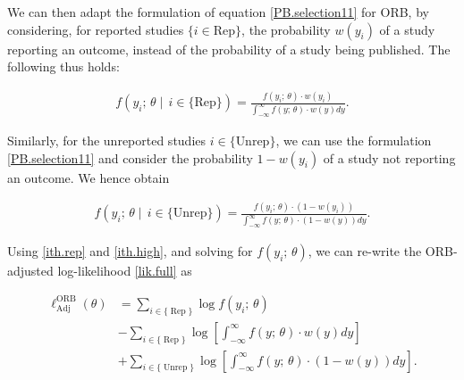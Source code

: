 \documentclass[twocolumn]{article}\usepackage[]{graphicx}\usepackage[]{xcolor}
\begin{document}
\bigskip

We can then adapt the formulation of equation \eqref{PB.selection11} for ORB, by considering, for reported studies $ \{i \in \text{Rep} \}$, the probability $w(y_i)$ of a study reporting an outcome, instead of the probability of a study being published. The following thus holds:

\bigskip

\begin{equation}
\label{ith.rep}
\begin{aligned}
f\left(y_i \text{; } \theta \mid  \, i \in \{\text{Rep}\} \right) = \frac{f\left(y_i \text{; } \theta \right) \cdot w(y_i)}{\int_{-\infty}^{\infty} f\left(y \text{; } \theta \right) \cdot w(y) d y} \text{.}
\end{aligned}
\end{equation}

\bigskip

Similarly, for the unreported studies $i \in \{\text{Unrep} \}$, we can use the formulation \eqref{PB.selection11} and consider the probability $1-w(y_i)$ of a study not reporting an outcome. We hence obtain

\bigskip

\begin{equation}
\label{ith.high}
\begin{aligned}
f\left(y_i \text{; } \theta \mid \, i \in \{\text{Unrep} \} \right) = \frac{f \left(y_i \text{; } \theta \right) \cdot \left(1-w(y_i) \right)}{\int_{-\infty}^{\infty} f \left(y \text{; } \theta \right) \cdot \left(1-w(y) \right) d y} \text{.}
\end{aligned}
\end{equation}

\bigskip

Using \eqref{ith.rep} and \eqref{ith.high}, and solving for $f(y_i \text{; } \theta)$, we can re-write the ORB-adjusted log-likelihood \eqref{lik.full} as

\bigskip


\begin{equation}
\label{lik.rewritten}
\begin{aligned}
\ell_{\text{Adj}}^{\text{ORB}} \left(\theta \right) & = \sum_{i \in \{\operatorname{Rep} \} } \log  f(y_i \text{; } \theta)\\
& - \sum_{i \in \{\operatorname{Rep} \} } \log \left[ \int_{-\infty}^{\infty} f\left(y \text{; } \theta \right) \cdot w(y) dy \right]\\
& + \sum_{i \in \{ \operatorname{Unrep} \}} \log \left[ \int_{-\infty}^{\infty} f(y \text{; } \theta) \cdot \left( 1 - w(y) \right) d y \right] \text{.}
\end{aligned}
\end{equation}
\end{document}
